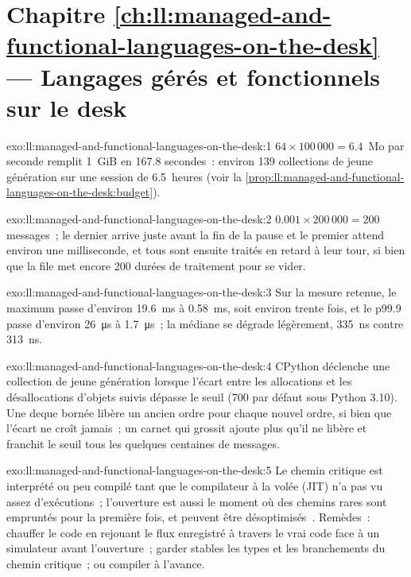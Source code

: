\section*{Chapitre \ref{ch:ll:managed-and-functional-languages-on-the-desk} --- Langages gérés et fonctionnels sur le desk}

\begin{solution}{exo:ll:managed-and-functional-languages-on-the-desk:1}
$64 \times 100\,000 = 6.4$~Mo par seconde remplit 1~GiB en 167.8 secondes~: environ 139 collections de jeune génération sur une session de 6.5~heures
(voir la \cref{prop:ll:managed-and-functional-languages-on-the-desk:budget}).
\end{solution}

\begin{solution}{exo:ll:managed-and-functional-languages-on-the-desk:2}
$0.001 \times 200\,000 = 200$ messages~; le dernier arrive juste avant la fin de la pause et le premier attend environ une milliseconde,
et tous sont ensuite traités en retard à leur tour, si bien que la file met encore 200 durées de traitement pour se vider.
\end{solution}

\begin{solution}{exo:ll:managed-and-functional-languages-on-the-desk:3}
Sur la mesure retenue, le maximum passe d'environ \qty{19.6}{\milli\second} à \qty{0.58}{\milli\second}, soit
environ trente fois, et le p99.9 passe d'environ \qty{26}{\micro\second} à \qty{1.7}{\micro\second}~; la médiane se dégrade légèrement,
\qty{335}{\nano\second} contre \qty{313}{\nano\second}.
\end{solution}

\begin{solution}{exo:ll:managed-and-functional-languages-on-the-desk:4}
CPython déclenche une collection de jeune génération lorsque l'écart entre les allocations et les désallocations d'objets suivis dépasse le seuil (700 par
défaut sous Python 3.10). Une deque bornée libère un ancien ordre pour chaque nouvel ordre, si bien que l'écart ne croît jamais~; un carnet qui grossit
ajoute plus qu'il ne libère et franchit le seuil tous les quelques centaines de messages.
\end{solution}

\begin{solution}{exo:ll:managed-and-functional-languages-on-the-desk:5}
Le chemin critique est interprété ou peu compilé tant que le compilateur à la volée (JIT) n'a pas vu assez d'exécutions~; l'ouverture est
aussi le moment où des chemins rares sont empruntés pour la première fois, et peuvent être désoptimisés~. Remèdes~: chauffer le code en rejouant le flux enregistré à travers le vrai code
face à un simulateur avant l'ouverture~; garder stables les types et les branchements du chemin critique~; ou compiler à l'avance.
\end{solution}

